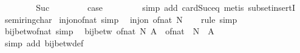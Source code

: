 \begin{isabellebody}
\ \ \isamarkupfalse%
\isanewline
\ \ \ \ \isamarkupfalse%
\ Suc\ \isanewline
\ \ \ \ \isamarkupfalse%
\ \isamarkupfalse%
\ {\isacharquery}{\kern0pt}case\ \isanewline
\ \ \ \ \ \ \isamarkupfalse%
\ {\isacharparenleft}{\kern0pt}simp\ add{\isacharcolon}{\kern0pt}\ card{\isacharunderscore}{\kern0pt}Suc{\isacharunderscore}{\kern0pt}eq{\isacharparenright}{\kern0pt}\ {\isacharparenleft}{\kern0pt}metis\ subset{\isacharunderscore}{\kern0pt}insertI{}{\isacharparenright}{\kern0pt}\isanewline
\ \ \isamarkupfalse%
\isanewline
{}\isamarkupfalse%
%
\endisatagproof
{\isafoldproof}%
%
\isadelimproof
%
\endisadelimproof
%
\isadelimdocument
%
\endisadelimdocument
%
\isatagdocument
%
\isamarkuptrue%
%
\endisatagdocument
{\isafolddocument}%
%
\isadelimdocument
%
\endisadelimdocument
{}\isamarkupfalse%
\ semiring{\isacharunderscore}{\kern0pt}char{\isacharunderscore}{\kern0pt}{}\isanewline
{}\isanewline
\isanewline
{}\isamarkupfalse%
\ inj{\isacharunderscore}{\kern0pt}on{\isacharunderscore}{\kern0pt}of{\isacharunderscore}{\kern0pt}nat\ {\isacharbrackleft}{\kern0pt}simp{\isacharbrackright}{\kern0pt}{\isacharcolon}{\kern0pt}\isanewline
\ \ {\isachardoublequoteopen}inj{\isacharunderscore}{\kern0pt}on\ of{\isacharunderscore}{\kern0pt}nat\ N{\isachardoublequoteclose}\isanewline
%
\isadelimproof
\ \ %
\endisadelimproof
%
\isatagproof
{}\isamarkupfalse%
\ rule\ simp%
\endisatagproof
{\isafoldproof}%
%
\isadelimproof
\isanewline
%
\endisadelimproof
\isanewline
{}\isamarkupfalse%
\ bij{\isacharunderscore}{\kern0pt}betw{\isacharunderscore}{\kern0pt}of{\isacharunderscore}{\kern0pt}nat\ {\isacharbrackleft}{\kern0pt}simp{\isacharbrackright}{\kern0pt}{\isacharcolon}{\kern0pt}\isanewline
\ \ {\isachardoublequoteopen}bij{\isacharunderscore}{\kern0pt}betw\ of{\isacharunderscore}{\kern0pt}nat\ N\ A\ {\isasymlongleftrightarrow}\ of{\isacharunderscore}{\kern0pt}nat\ {\isacharbackquote}{\kern0pt}\ N\ {\isacharequal}{\kern0pt}\ A{\isachardoublequoteclose}\isanewline
%
\isadelimproof
\ \ %
\endisadelimproof
%
\isatagproof
{}\isamarkupfalse%
\ {\isacharparenleft}{\kern0pt}simp\ add{\isacharcolon}{\kern0pt}\ bij{\isacharunderscore}{\kern0pt}betw{\isacharunderscore}{\kern0pt}def{\isacharparenright}{\kern0pt}%
\endisatagproof
{\isafoldproof}%
%
\isadelimproof
\isanewline
%
\endisadelimproof
\isanewline
{}\isamarkupfalse%

\end{isabellebody}
